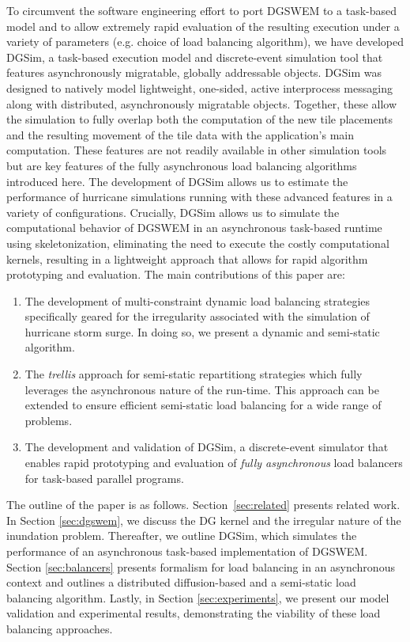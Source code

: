To circumvent the software engineering effort to port DGSWEM to a task-based model and to allow extremely rapid evaluation of the resulting execution under a variety of parameters (e.g. choice of load balancing algorithm), we have developed DGSim, a task-based execution model and discrete-event simulation tool that features asynchronously migratable, globally addressable objects.
DGSim was designed to natively model lightweight, one-sided, active interprocess messaging along with distributed, asynchronously migratable objects.  Together, these allow the simulation to fully overlap both the computation of the new tile placements and the resulting movement of the tile data with the application's main computation.  These features are not readily available in other simulation tools but are key features of the fully asynchronous load balancing algorithms introduced here.
The development of DGSim allows us to estimate the performance of hurricane simulations running with these advanced features in a variety of configurations.
Crucially, DGSim allows us to simulate the computational behavior of DGSWEM in an asynchronous task-based runtime using skeletonization, eliminating the need to execute the costly computational kernels, resulting in a lightweight approach that allows for rapid algorithm prototyping and evaluation.
The main contributions of this paper are:
\begin{enumerate}
\item The development of multi-constraint dynamic load balancing strategies specifically geared for the irregularity associated with the simulation of hurricane storm surge. In doing so, we present a dynamic and semi-static algorithm.
\item The \emph{trellis} approach for semi-static repartitiong strategies which fully leverages the asynchronous nature of the run-time. This approach can be extended to ensure efficient semi-static load balancing for a wide range of problems.
\item The development and validation of DGSim, a discrete-event simulator that enables rapid prototyping and evaluation of {\em fully asynchronous} load balancers for task-based parallel programs.
\end{enumerate}

The outline of the paper is as follows. Section~\ref{sec:related} presents related work.  In Section \ref{sec:dgswem}, we discuss the DG kernel and the irregular nature of the inundation problem. Thereafter, we outline DGSim, which simulates the performance of an asynchronous task-based implementation of DGSWEM. Section \ref{sec:balancers} presents formalism for load balancing in an asynchronous context and outlines a distributed diffusion-based and a semi-static load balancing algorithm. Lastly, in Section \ref{sec:experiments}, we present our model validation and experimental results, demonstrating the viability of these load balancing approaches.
